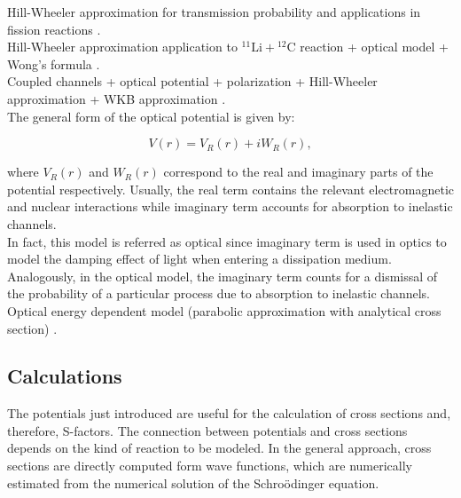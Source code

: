 \documentclass[openany]{book}
\begin{document}
Hill-Wheeler approximation for transmission probability and applications in fission reactions \cite{hill_wheeler_1953}. \\

Hill-Wheeler approximation  application to $\mathrm{{}^{11}Li + {}^{12}C}$ reaction + optical model + Wong's formula  \cite{esbensen_2012}. \\
 
Coupled channels + optical potential +  polarization +  Hill-Wheeler approximation  +  WKB approximation \cite{cardenas_canto_donangelo_hussein_lubian_romanelli_2002}. \\ 

The general form of the optical potential is given by:

\begin{equation}  \label{eq:potential_Optical}
	V(r) = V_R(r) + iW_R(r),
\end{equation}

where $V_R(r)$ and $W_R(r)$ correspond to the real and imaginary parts of the potential respectively. Usually, the real term contains the relevant electromagnetic and nuclear interactions while imaginary term accounts for absorption to inelastic channels. \\

In fact, this model is referred as optical since imaginary term is used in optics to model the damping effect of light when entering a dissipation medium. Analogously, in the optical model, the imaginary term counts for a dismissal of the probability of a particular process due to absorption to inelastic channels. \\

Optical energy dependent model (parabolic approximation with analytical cross section) \cite{singh_sukhvinder_kharab_2013B}. \\

\subsection{Calculations}  \label{sub:potential_calculations}

The potentials just introduced are useful for the calculation of cross sections and, therefore, S-factors. The connection between potentials and cross sections depends on the kind of reaction to be modeled. In the general approach, cross sections are directly computed form wave functions,  which are numerically estimated from the numerical solution of the Schroödinger equation. \\
\end{document}
